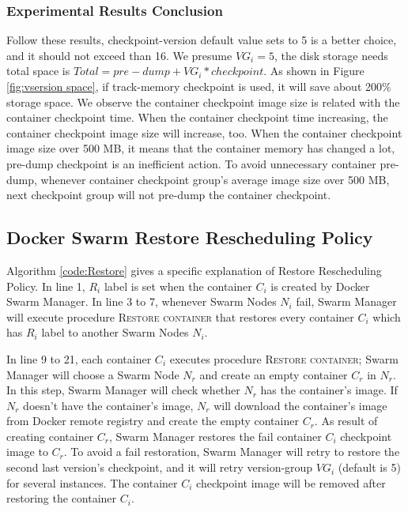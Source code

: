 \subsubsection{Experimental Results Conclusion}
Follow these results, checkpoint-version default value sets to 5 is a better choice, and it should not exceed than 16.
We presume $ VG_i = 5 $, the disk storage needs total space is $ Total = pre-dump + VG_i * checkpoint $.  As shown in Figure \ref{fig:vsersion space}, if track-memory checkpoint is used, it will save about 200\% storage space.
We observe the container checkpoint image size is related with the container checkpoint time.
When the container checkpoint time increasing, the container checkpoint image size will increase, too.
When the container checkpoint image size over 500 MB, it means that the container memory has changed a lot, pre-dump checkpoint is an inefficient action.
To avoid unnecessary container pre-dump, whenever container checkpoint group's average image size over 500 MB, next checkpoint group will not pre-dump the container checkpoint.

\subsection{Docker Swarm Restore Rescheduling Policy}
Algorithm \ref{code:Restore} gives a specific explanation of Restore Rescheduling Policy. In line 1, $ R_i $ label is set when the container $C_i$ is created by Docker Swarm Manager.
In line 3 to 7, whenever Swarm Nodes $ N_i $ fail, Swarm Manager will execute procedure \textsc{Restore container} that restores every container $ C_i $ which has $ R_i $ label to another Swarm Nodes $ N_i $.

In line 9 to 21, each container $ C_i $ executes procedure \textsc{Restore container}; Swarm Manager will choose a Swarm Node $ N_r $ and create an empty container $ C_r $ in $ N_r $. In this step, Swarm Manager will check whether $ N_r $ has the container's image. If $ N_r $ doesn't have the container's image, $ N_r $ will download the container's image from Docker remote registry and create the empty container $ C_r $.
As result of creating container $ C_r $, Swarm Manager restores the fail container $ C_i $ checkpoint image to $ C_r $. To avoid a fail restoration, Swarm Manager will retry to restore the second last version's checkpoint, and it will retry version-group $ VG_i $ (default is 5) for several instances. The container $ C_i $ checkpoint image will be removed after restoring the container $ C_i $.

